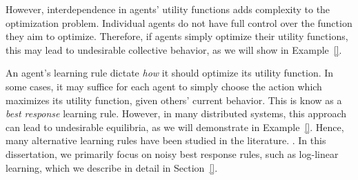 However, interdependence in agents' utility functions adds complexity to the optimization problem. Individual agents do not have full control over the function they aim to optimize. Therefore, if agents simply optimize their utility functions, this may lead to undesirable collective behavior, as we will show in Example~\ref{}.  













 An agent's learning rule dictate {\it how} it should optimize its utility function. In some cases, it may suffice for each agent to simply choose the action which maximizes its utility function, given others' current behavior. This is know as a {\it best response} learning rule. However, in many distributed systems, this approach can lead to undesirable equilibria, as we will demonstrate in Example~\ref{}. Hence, many alternative learning rules have been studied in the literature. . In this dissertation, we primarily focus on noisy best response rules, such as log-linear learning, which we describe in detail in Section~\ref{}.

